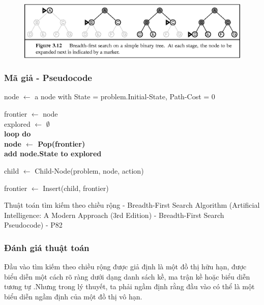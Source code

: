 \documentclass{article}
\newcommand{\LoopDo}{\bf loop do}
\let\oldemptyset\emptyset
\let\emptyset\varnothing
\begin{document}
\begin{figure}[h]
\includegraphics[width=16cm]{19-Figure3.12-1.png}
\centering
\end{figure}

\subsubsection{Mã giả - Pseudocode}

\begin{algorithm}[H]
\DontPrintSemicolon
  

node $\leftarrow$ a node with State = problem.Initial-State, Path-Cost = 0 \\
{
}

frontier $\leftarrow$ node\\
explored $\leftarrow$ $\oldemptyset$\\
\LoopDo\\
\If{frontier = $\oldemptyset$}
{
}
node $\leftarrow$ Pop(frontier)\\
add node.State to explored \\
{
    child $\leftarrow$ Child-Node(problem, node, action)
    
    {
        {
        }
        frontier $\leftarrow$  Insert(child, frontier)
    }
}
\EndFunction
\caption{Thuật toán tìm kiếm theo chiều rộng - Breadth-First Search Algorithm (Artificial Intelligence: A Modern Approach (3rd Edition) - Breadth-First Search Pseudocode) - P82}
\end{algorithm}

\subsubsection{Đánh giá thuật toán}
Đầu vào tìm kiếm theo chiều rộng được giả định là một đồ thị hữu hạn, được biểu diễn một cách rõ ràng dưới dạng danh sách kề, ma trận kề hoặc biểu diễn tương tự .Nhưng trong lý thuyết, ta phải ngầm định rằng đầu vào có thể là một biểu diễn ngầm định của một đồ thị vô hạn.
\end{document}
